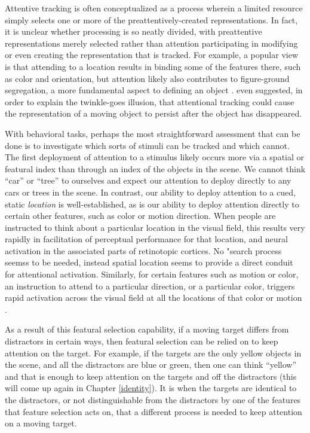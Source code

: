 \documentclass[
]{book}
\begin{document}
Attentive tracking is often conceptualized as a process wherein a limited resource simply selects one or more of the preattentively-created representations. In fact, it is unclear whether processing is so neatly divided, with preattentive representations merely selected rather than attention participating in modifying or even creating the representation that is tracked. For example, a popular view is that attending to a location results in binding some of the features there, such as color and orientation, but attention likely also contributes to figure-ground segregation, a more fundamental aspect to defining an object \citep{petersonLowlevelHighlevelContributions2014}. \citet{nakayamaDynamicNoiseBackground2021} even suggested, in order to explain the twinkle-goes illusion, that attentional tracking could cause the representation of a moving object to persist after the object has disappeared.

With behavioral tasks, perhaps the most straightforward assessment that can be done is to investigate which sorts of stimuli can be tracked and which cannot. The first deployment of attention to a stimulus likely occurs more via a spatial or featural index than through an index of the objects in the scene. We cannot think ``car'' or ``tree'' to ourselves and expect our attention to deploy directly to any cars or trees in the scene. In contrast, our ability to deploy attention to a cued, static \emph{location} is well-established, as is our ability to deploy attention directly to certain other features, such as color or motion direction. When people are instructed to think about a particular location in the visual field, this results very rapidly in facilitation of perceptual performance for that location, and neural activation in the associated parts of retinotopic cortices. No "search process seemss to be needed, instead spatial location seems to provide a direct conduit for attentional activation. Similarly, for certain features such as motion or color, an instruction to attend to a particular direction, or a particular color, triggers rapid activation across the visual field at all the locations of that color or motion \citep{saenzGlobalFeaturebasedAttention2003, whiteFeaturebasedAttentionInvoluntarily2011}.

As a result of this featural selection capability, if a moving target differs from distractors in certain ways, then featural selection can be relied on to keep attention on the target. For example, if the targets are the only yellow objects in the scene, and all the distractors are blue or green, then one can think ``yellow'' and that is enough to keep attention on the targets and off the distractors (this will come up again in Chapter \ref{identity}). It is when the targets are identical to the distractors, or not distinguishable from the distractors by one of the features that feature selection acts on, that a different process is needed to keep attention on a moving target.
\end{document}
